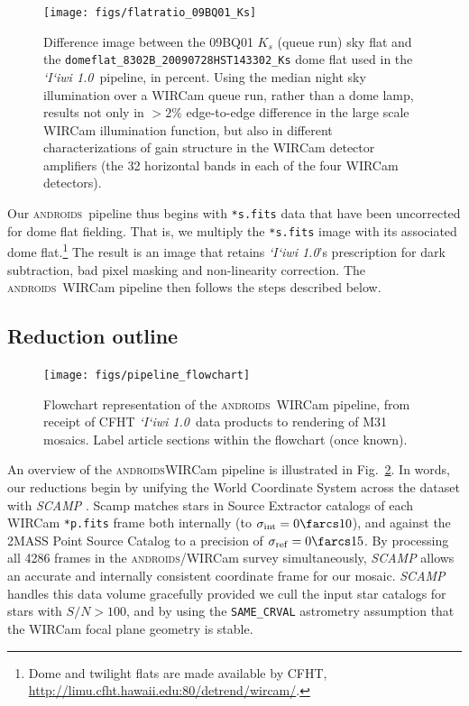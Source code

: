 \documentclass[iop]{emulateapj}
\newcommand{\sw}[1]{\textit{#1}} %
\newcommand{\iiwione}{\sw{`I`iwi 1.0}}
\newcommand{\androids}{\textsc{androids}}
\newcommand{\todo}[1]{\textcolor{BurntOrange}{\textsf{#1}}} %
\newcommand{\Fig}[1]{Fig.~\ref{fig:#1}}  %
\begin{document}
\begin{figure}[t]
\centering
\texttt{[image: figs/flatratio\_09BQ01\_Ks]}
\caption{Difference image between the 09BQ01 $K_s$ (queue run) sky flat and the \texttt{domeflat\_8302B\_20090728HST143302\_Ks} dome flat used in the \iiwione\ pipeline, in percent.
Using the median night sky illumination over a WIRCam queue run, rather than a dome lamp, results not only in $>2$\% edge-to-edge difference in the large scale WIRCam illumination function, but also in different characterizations of gain structure in the WIRCam detector amplifiers (the 32 horizontal bands in each of the four WIRCam detectors).}
\label{fig:domeflatratio}
\end{figure}

\vspace{1em}

Our \androids\ pipeline thus begins with \texttt{*s.fits} data that have been uncorrected for dome flat fielding.
That is, we multiply the \texttt{*s.fits} image with its associated dome flat.\footnote{Dome and twilight flats are made available by CFHT, \url{http://limu.cfht.hawaii.edu:80/detrend/wircam/}.}
The result is an image that retains \iiwione's prescription for dark subtraction, bad pixel masking and non-linearity correction.
The \androids\ WIRCam pipeline then follows the steps described below.

\subsection{Reduction outline}
\label{sec:reduction_outline}

\begin{figure}[t]
\centering
\texttt{[image: figs/pipeline\_flowchart]}
\caption{Flowchart representation of the \androids\ WIRCam pipeline, from receipt of CFHT \iiwione\ data products to rendering of M31 mosaics.
\todo{Label article sections within the flowchart (once known).}}
\label{fig:flowchart}
\end{figure}

An overview of the \androids\/WIRCam pipeline is illustrated in \Fig{flowchart}.
In words, our reductions begin by unifying the World Coordinate System across the dataset with \sw{SCAMP} \citep{Bertin:2006}.
Scamp matches stars in Source Extractor \citep{Bertin:1996} catalogs of each WIRCam \texttt{*p.fits} frame both internally (to $\sigma_\mathrm{int}=0\farcs 10$), and against the 2MASS Point Source Catalog \citep{Skrutskie:2006} to a precision of $\sigma_\mathrm{ref}=0 \farcs 15$.
By processing all 4286 frames in the \androids /WIRCam survey simultaneously, \sw{SCAMP} allows an accurate and internally consistent coordinate frame for our mosaic.
\sw{SCAMP} handles this data volume gracefully provided we cull the input star catalogs for stars with $S/N > 100$, and by using the \texttt{SAME\_CRVAL} astrometry assumption that the WIRCam focal plane geometry is stable.
\end{document}
